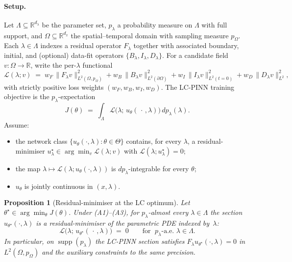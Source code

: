 \documentclass{article}
\theoremstyle{plain}
\newtheorem{proposition}[theorem]{Proposition}
\theoremstyle{definition}
\theoremstyle{remark}
\begin{document}
\paragraph{Setup.}
Let $\Lambda \subseteq \mathbb{R}^{d_\lambda}$ be the parameter set,
$p_\lambda$ a probability measure on $\Lambda$ with full support, and
$\Omega \subseteq \mathbb{R}^{d_x}$ the spatial--temporal domain with
sampling measure $p_\Omega$. Each $\lambda \in \Lambda$ indexes a
residual operator $F_\lambda$ together with associated boundary,
initial, and (optional) data-fit operators
$\{B_\lambda, I_\lambda, D_\lambda\}$. For a candidate field
$v: \Omega \to \mathbb{R}$, write the per-$\lambda$ functional
\[
   \mathcal{L}(\lambda; v) \;=\;
     w_F\,\| F_\lambda v \|_{L^2(\Omega, p_\Omega)}^2
   + w_B\,\| B_\lambda v \|_{L^2(\partial\Omega)}^2
   + w_I\,\| I_\lambda v \|_{L^2(t=0)}^2
   + w_D\,\| D_\lambda v \|_{L^2}^2 ,
\]
with strictly positive loss weights $(w_F, w_B, w_I, w_D)$. The
LC-PINN training objective is the $p_\lambda$-expectation
\[
   J(\theta) \;=\;
     \int_{\Lambda} \mathcal{L}\bigl(\lambda;\, u_\theta(\,\cdot\,, \lambda)\bigr)
     \, dp_\lambda(\lambda) .
\]
Assume:
\begin{itemize}\setlength{\itemsep}{0pt}
   \item[(A1)] the network class
         $\{u_\theta(\cdot, \lambda) : \theta \in \Theta\}$ contains,
         for every $\lambda$, a residual-minimiser
         $u^\star_\lambda \in \arg\min_v \mathcal{L}(\lambda; v)$ with
         $\mathcal{L}(\lambda; u^\star_\lambda) = 0$;
   \item[(A2)] the map
         $\lambda \mapsto \mathcal{L}(\lambda; u_\theta(\cdot,\lambda))$
         is $dp_\lambda$-integrable for every $\theta$;
   \item[(A3)] $u_\theta$ is jointly continuous in $(x, \lambda)$.
\end{itemize}

\begin{proposition}[Residual-minimiser at the LC optimum]
\label{prop:lc-invariance}
Let $\theta^\star \in \arg\min_\theta J(\theta)$. Under
\textnormal{(A1)--(A3)}, for $p_\lambda$-almost every
$\lambda \in \Lambda$ the section
$u_{\theta^\star}(\cdot, \lambda)$ is a residual-minimiser of the
parametric PDE indexed by~$\lambda$:
\[
   \mathcal{L}\bigl(\lambda;\, u_{\theta^\star}(\,\cdot\,, \lambda)\bigr)
   \;=\; 0
   \qquad\text{for }\; p_\lambda\text{-a.e.\ } \lambda \in \Lambda .
\]
In particular, on $\operatorname{supp}(p_\lambda)$ the LC-PINN section
satisfies $F_\lambda u_{\theta^\star}(\cdot,\lambda) = 0$ in
$L^2(\Omega, p_\Omega)$ and the auxiliary constraints to the same
precision.
\end{proposition}
\end{document}
